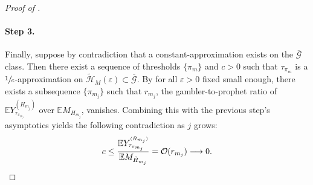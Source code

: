\documentclass[11pt, a4paper, twoside]{article}
\DeclareRobustCommand{\bigO}{\text{\usefont{OMS}{cmsy}{m}{n}O}}
\newcommand{\ssup}[1]{{\scriptscriptstyle{({#1})}}}
\newcommand{\eps}{\varepsilon}
\newcommand{\EE}{\mathbb{E}}
\newcommand{\PGFd}{\overline{\mathcal{G}}}
\numberwithin{equation}{section}
\begin{document}
\begin{proof}[Proof of ]
		\paragraph{Step 3.} Finally, suppose by contradiction that a constant-approximation exists on the $\PGFd$ class. Then there exist a sequence of thresholds $\{\pi_m\}$ and $c>0$ such that $\tau_{\pi_m}$ is a $\sfrac{1}{c}$-approximation on $\tilde{\mathcal{H}}_M(\eps)\subset\PGFd$. By  for all $\eps>0$ fixed small enough, there exists a subsequence $\{\pi_{m_j}\}$ such that 
		$r_{m_j}$, the gambler-to-prophet ratio of $\EE Y_{\tau_{\pi_{m_j}}}^\ssup{H_{m_j}}$ over $\EE M_{H_{m_j}}$, vanishes. Combining this with the previous step's asymptotics yields the following contradiction as $j$ grows:
		\begin{equation*}
			c\le\frac{ \EE Y_{\tau_{\pi_{m_j}}}^\ssup{\tilde{H}_{m_j}}}{\EE M_{\tilde{H}_{m_j}}}=\bigO( r_{m_j})\longrightarrow0.
		\end{equation*}
	\end{proof}
\end{document}
